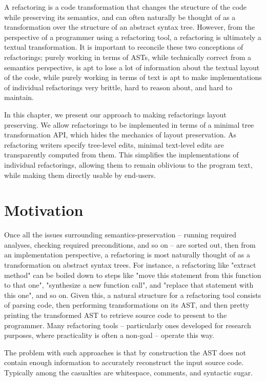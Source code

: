 A refactoring is a code transformation that changes the structure of the code
while preserving its semantics, and can often naturally be thought of as a
transformation over the structure of an abstract syntax tree. However, from
the perspective of a programmer using a refactoring tool, a refactoring is
ultimately a textual transformation. It is important to reconcile these two
conceptions of refactorings; purely working in terms of ASTs, while
technically correct from a semantics perspective, is apt to lose a lot
of information about the textual layout of the code, while purely working
in terms of text is apt to make implementations of individual refactorings
very brittle, hard to reason about, and hard to maintain.

In this chapter, we present our approach to making refactorings layout
preserving.  We allow refactorings to be implemented in terms of a minimal tree
transformation API, which hides the mechanics of layout preservation. As
refactoring writers specify tree-level edits, minimal text-level edits are
transparently computed from them. This simplifies the implementations of
individual refactorings, allowing them to remain oblivious to the program text,
while making them directly usable by end-users.

\section{Motivation}

Once all the issues surrounding semantics-preservation -- running required
analyses, checking required preconditions, and so on -- are sorted out,
then from an implementation perspective, a refactoring is most
naturally thought of as a transformation on abstract syntax trees. For
instance, a refactoring like "extract method" can be boiled down to steps like
"move this statement from this function to that one", "synthesize a new
function call", and "replace that statement with this one", and so
on. Given this, a natural structure for a refactoring tool consists of parsing
code, then performing transformations on its AST, and then pretty printing the
transformed AST to retrieve source code to present to the programmer. Many
refactoring tools -- particularly ones developed for research purposes, where
practicality is often a non-goal -- operate this way.

The problem with such approaches is that by construction the AST does not
contain enough information to accurately reconstruct the input source code.
Typically among the casualties are whitespace, comments, and syntactic sugar.

